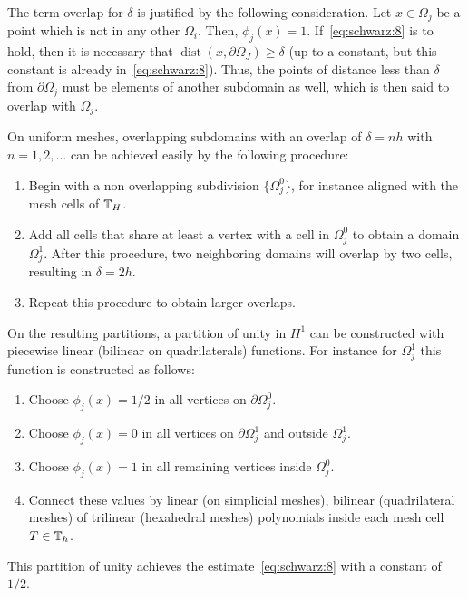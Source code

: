 \begin{note}
  The term overlap for $\delta$ is justified by the following
  consideration. Let $x \in \Omega_j$ be a point which is not in any
  other $\Omega_i$. Then, $\phi_j(x) = 1$. If~\eqref{eq:schwarz:8} is
  to hold, then it is necessary that
  $\operatorname{dist}(x,\partial\Omega_J) \ge \delta$ (up to a
  constant, but this constant is already
  in~\eqref{eq:schwarz:8}). Thus, the points of distance less than
  $\delta$ from $\partial\Omega_j$ must be elements of another
  subdomain as well, which is then said to overlap with $\Omega_j$.
\end{note}

\begin{example}
  \label{example:schwarz:2}
  On uniform meshes, overlapping subdomains with an overlap of
  $\delta = n h$ with $n=1,2,\ldots$ can be achieved easily by the
  following procedure:
  \begin{enumerate}
  \item Begin with a non overlapping subdivision $\{\Omega_j^0\}$,
    for instance aligned with the mesh cells of $\mathbb T_H$.
  \item Add all cells that share at least a vertex with a cell in
    $\Omega_j^0$ to obtain a domain $\Omega_j^1$. After this
    procedure, two neighboring domains will overlap by two cells,
    resulting in $\delta = 2h$.
  \item Repeat this procedure to obtain larger overlaps.
  \end{enumerate}
  
  On the resulting partitions, a partition of unity in $H^1$ can be
  constructed with piecewise linear (bilinear on quadrilaterals)
  functions. For instance for $\Omega_j^1$ this function is
  constructed as follows:
  \begin{enumerate}
  \item Choose $\phi_j(x) = 1/2$ in all vertices on $\partial \Omega_j^0$.
  \item Choose $\phi_j(x) = 0$ in all vertices on $\partial \Omega_j^1$ and outside
    $\Omega_j^1$.
  \item Choose $\phi_j(x) = 1$ in all remaining vertices inside
    $\Omega_j^0$.
    \item Connect these values by linear (on simplicial meshes), bilinear
      (quadrilateral meshes) of trilinear (hexahedral meshes)
      polynomials inside each mesh cell $T\in \mathbb T_h$.
  \end{enumerate}
  This partition of unity achieves the estimate~\eqref{eq:schwarz:8}
  with a constant of $1/2$.
\end{example}

